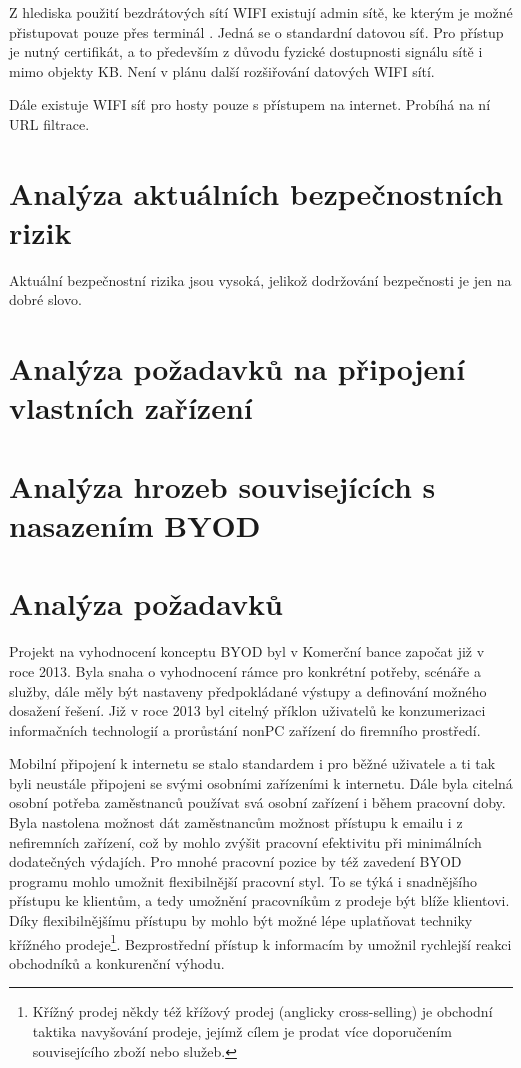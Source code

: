 Z hlediska použití bezdrátových sítí WIFI existují admin sítě, ke kterým je možné přistupovat pouze přes terminál . Jedná se o standardní datovou síť. Pro přístup je nutný certifikát, a to především z důvodu fyzické dostupnosti signálu sítě i mimo objekty KB. Není v plánu další rozšiřování datových WIFI sítí.  

Dále existuje WIFI síť pro hosty pouze s přístupem na internet. Probíhá na ní URL filtrace.


\section{Analýza aktuálních bezpečnostních rizik}
Aktuální bezpečnostní rizika jsou vysoká, jelikož dodržování bezpečnosti je jen na dobré slovo. 

\section{Analýza požadavků na připojení vlastních zařízení} 

\section{Analýza hrozeb souvisejících s nasazením BYOD}

\section{Analýza požadavků}
Projekt na vyhodnocení konceptu BYOD byl v Komerční bance započat již v roce 2013. Byla snaha o vyhodnocení rámce pro konkrétní potřeby, scénáře a služby, dále měly být nastaveny předpokládané výstupy a definování možného dosažení řešení. Již v roce 2013 byl citelný příklon uživatelů ke konzumerizaci informačních technologií a prorůstání nonPC zařízení do firemního prostředí.

Mobilní připojení k internetu se stalo standardem i pro běžné uživatele a ti tak byli neustále připojeni se svými osobními zařízeními k internetu. Dále byla citelná osobní potřeba zaměstnanců používat svá osobní zařízení i během pracovní doby. Byla nastolena možnost dát zaměstnancům možnost přístupu k emailu i z nefiremních zařízení, což by mohlo zvýšit pracovní efektivitu při minimálních dodatečných výdajích. Pro mnohé pracovní pozice by též zavedení BYOD programu mohlo umožnit flexibilnější pracovní styl. To se týká i snadnějšího přístupu ke klientům, a tedy umožnění pracovníkům z prodeje být blíže klientovi. Díky flexibilnějšímu přístupu by mohlo být možné lépe uplatňovat techniky křížného prodeje\footnote{Křížný prodej někdy též křížový prodej (anglicky cross-selling) je obchodní taktika navyšování prodeje, jejímž cílem je prodat více doporučením souvisejícího zboží nebo služeb.}. Bezprostřední přístup k informacím by umožnil rychlejší reakci obchodníků a konkurenční výhodu. 

